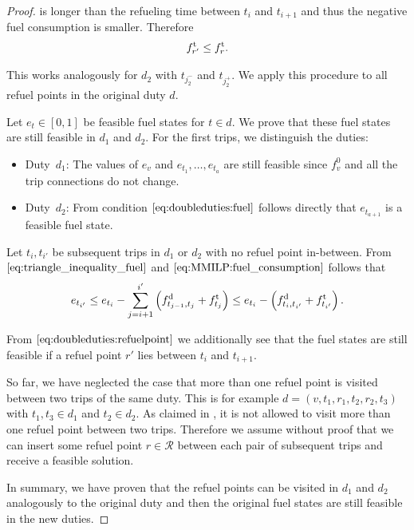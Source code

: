 \begin{proof}
is longer than the refueling time between $t_i$ and $t_{i+1}$ and thus the negative fuel consumption is smaller. Therefore
\begin{align}
	f^{\operatorname{t}}_{r'}\leq f^{\operatorname{t}}_{r}. \label{eq:doubleduties:refuelpoint}
\end{align}

This works analogously for $d_2$ with $t_{j^-_2}$ and $t_{j^+_2}$. We apply this procedure to all refuel points in the original duty $d$.

Let $e_t\in[0,1]$ be feasible fuel states for ${t\in d}$. We prove that these fuel states are still feasible in $d_1$ and $d_2$. For the first trips, we distinguish the duties:
\begin{itemize}
	\item{Duty~$d_1$:}
		The values of $e_v$ and ${e_{t_1},\dots,e_{t_a}}$ are still feasible since $f^0_v$ and all the trip connections do not change.
	\item{Duty~$d_2$:}
		From condition $\eqref{eq:doubleduties:fuel}$ follows directly that $e_{t_{a+1}}$ is a feasible fuel state.
\end{itemize}

Let $t_i,t_{i'}$ be subsequent trips in $d_1$ or $d_2$ with no refuel point in-between. From $\eqref{eq:triangle_inequality_fuel}$ and $\eqref{eq:MMILP:fuel_consumption}$ follows that
\begin{align*}
	e_{t_{i'}} \leq e_{t_i} - \sum_{j=i+1}^{i'} \left(f^{\operatorname{d}}_{t_{j-1},t_j}+f^{\operatorname{t}}_{t_j}\right) \leq e_{t_i} - \left(f^{\operatorname{d}}_{t_i,t_{i'}} + f^{\operatorname{t}}_{t_{i'}}\right).
\end{align*}

From $\eqref{eq:doubleduties:refuelpoint}$ we additionally see that the fuel states are still feasible if a refuel point $r'$ lies between $t_i$ and $t_{i+1}$.

So far, we have neglected the case that more than one refuel point is visited between two trips of the same duty. This is for example ${d=\left(v,t_1,r_1,t_2,r_2,t_3\right)}$ with ${t_1,t_3\in d_1}$ and ${t_2\in d_2}$. As claimed in , it is not allowed to visit more than one refuel point between two trips. Therefore we assume without proof that we can insert some refuel point ${r\in\mathcal{R}}$ between each pair of subsequent trips and receive a feasible solution.

In summary, we have proven that the refuel points can be visited in $d_1$ and $d_2$ analogously to the original duty and then the original fuel states are still feasible in the new duties.


\end{proof}
